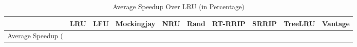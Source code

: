 \begin{table}
\caption{Average Speedup Over LRU (in Percentage)}
\label{tab:avgSpeedup}
\begin{tabular}{lrrrrrrrrr}
\toprule
 & LRU & LFU & Mockingjay & NRU & Rand & RT-RRIP & SRRIP & TreeLRU & Vantage \\
\midrule
Average Speedup (%
\bottomrule
\end{tabular}
\end{table}
